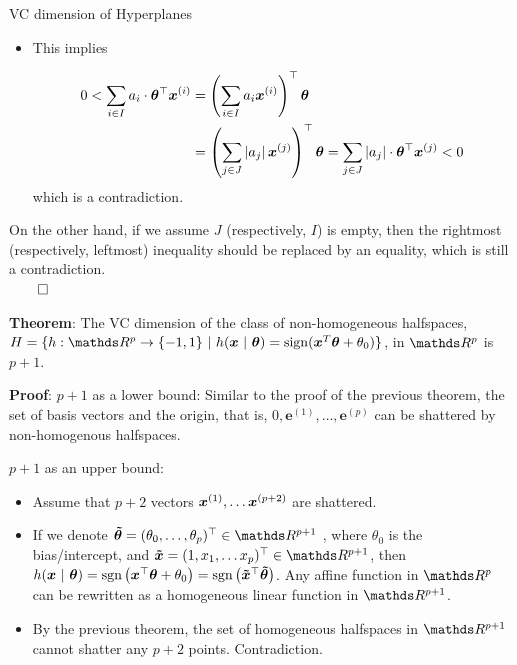 \begin{vbframe}{VC dimension of Hyperplanes}
\begin{itemize}
  \item This implies
  
  \begin{equation*}
    \begin{split}
  0<\sum_{i \in I} a_{i} \cdot \bm{\theta}^\top \bm{x}^{(i)} & = \left(\sum_{i \in I} a_{i} \bm{x}^{(i)}\right)^\top \bm{\theta} \\ 
  & = \left(\sum_{j \in J}\left|a_{j}\right| \bm{x}^{(j)}\right)^\top \bm{\theta} =\sum_{j \in J}\left|a_{j}\right| \cdot \bm{\theta}^\top \bm{x}^{(j)} < 0
    \end{split}
  \end{equation*} which is a contradiction.
\end{itemize}

On the other hand, if we assume $J$ (respectively, $I$) is empty, then the rightmost (respectively, leftmost) inequality should be replaced by an equality, which is still a contradiction.\\
\hspace*{\fill}   $\qed$

\framebreak

\textbf{Theorem}: The VC dimension of the class of non-homogeneous halfspaces, $\Hspace = \{h: \R^p \to \{-1, 1\} \text{ | } h(\xv~|~\bm{\theta}) = \sign(\xv^T\bm{\theta} + \theta_0)\}$, in $\R^p$ is $p+1$.

\textbf{Proof}:
$p+1$ as a lower bound: Similar to the proof of the previous theorem, the set of basis vectors and the origin, that is, $0,\mathbf{e}^{(1)},\ldots,\mathbf{e}^{(p)}$ can be shattered by non-homogenous halfspaces.

\lz

$p+1$ as an upper bound: 
\begin{itemize}
  \item Assume that $p+2$ vectors $\bm{x}^{(1)}, \ldots \bm{x}^{(p+2)}$ are shattered. 
  \item If we denote $\bm{\tilde \theta} = (\theta_0, \ldots, \theta_p)^\top \in \R^{p+1}$ , where $\theta_0$ is the bias/intercept, and $\bm{\tilde x} = (1,x_1,\ldots x_{p})^\top \in \R^{p+1}$, then $h(\bm{x}~|~\bm{\theta})=\text{sgn}\left(\bm{x}^\top \bm{\theta}+ \theta_0\right)=\text{sgn}\left(\bm{\tilde x}^\top\bm{\tilde\theta}\right)$. Any affine function in $\R^p$ can be rewritten as a homogeneous linear function in $\R^{p+1}$.
  \item By the previous theorem, the set of homogeneous halfspaces in $\R^{p+1}$ cannot shatter any $p+2$ points. Contradiction.
\end{itemize}
\end{vbframe}


